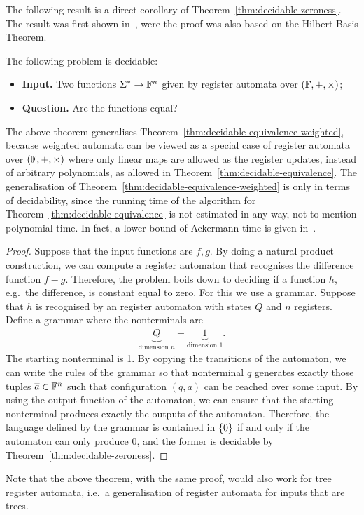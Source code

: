 The following result is a direct corollary of Theorem~\ref{thm:decidable-zeroness}. The result was first shown in~\cite[Theorem 4]{Benedikt:2017eq}, were the proof was also based on the Hilbert Basis Theorem. 

\begin{theorem}\label{thm:decidable-equivalence}
	The  following problem is decidable:
	\begin{itemize}
		\item {\bf Input.} Two functions $ \Sigma^* \to \mathbb F^n$ given by register automata over $(\mathbb F,+,\times)$;
		\item {\bf Question.} Are the functions equal?
	\end{itemize} 
\end{theorem}
The above theorem generalises Theorem~\ref{thm:decidable-equivalence-weighted}, because weighted automata can be viewed as a special case of register automata over $(\mathbb F,+,\times)$ where only linear maps are allowed as the register updates, instead of arbitrary polynomials, as allowed in Theorem~\ref{thm:decidable-equivalence}.   The generalisation of Theorem~\ref{thm:decidable-equivalence-weighted} is  only in terms of decidability, since the running time of the algorithm for Theorem~\ref{thm:decidable-equivalence} is not estimated in any way, not to mention polynomial time. In fact, a lower bound of Ackermann time is given in~\cite[Theorem 1]{Benedikt:2017eq}.
\begin{proof}
Suppose that the input functions are $f,g$. By doing a natural product construction, we can compute a register automaton that recognises the difference function $f-g$. Therefore, the problem boils down to deciding if a function $h$, e.g.~the difference, is constant equal to zero. For this we use a grammar. Suppose that $h$ is recognised by an register automaton with states $Q$ and $n$ registers. Define a grammar where the nonterminals are 
\begin{align*}
 \underbrace{Q}_{\text{dimension $n$}} + \underbrace{1}_{\text{dimension 1}}.
\end{align*}
The starting nonterminal is 1. By copying the transitions of the automaton, we can write the rules of the grammar so that nonterminal $q$ generates exactly those tuples $\overline{a} \in \mathbb F^n$ such that configuration $(q,\bar a)$ can be reached over some input. By using the output function of the automaton, we can ensure that the starting nonterminal produces exactly the outputs of the automaton. Therefore, the language defined by the grammar is contained in $\{0\}$ if and only if the automaton can only produce $0$, and the former is decidable by Theorem~\ref{thm:decidable-zeroness}. 
\end{proof}
Note that the above theorem, with the same proof, would also work for tree register automata, i.e.~a  generalisation of register automata for inputs that are trees.

